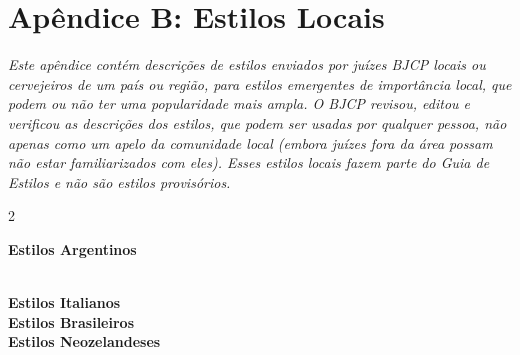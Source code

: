 \clearpage
{}
\divisorLine
\section*{Apêndice B: Estilos Locais}

\textit{Este apêndice contém descrições de estilos enviados por juízes BJCP locais ou cervejeiros de um país ou região, para estilos emergentes de importância local, que podem ou não ter uma popularidade mais ampla. O BJCP revisou, editou e verificou as descrições dos estilos, que podem ser usadas por qualquer pessoa, não apenas como um apelo da comunidade local (embora juízes fora da área possam não estar familiarizados com eles). Esses estilos locais fazem parte do Guia de Estilos e não são estilos provisórios.}

\begin{multicols*}{2}

  \textbf{\Large\color{blue}Estilos Argentinos }
  
	\\

  \textbf{\Large\color{blue}Estilos Italianos }
	\\

  \textbf{\Large\color{blue}Estilos Brasileiros }
	\\

  \textbf{\Large\color{blue}Estilos Neozelandeses }

	

\end{multicols*}
